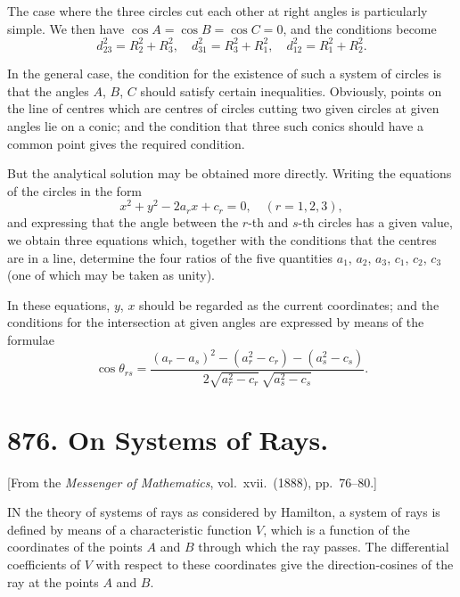 \documentclass[12pt,a4paper]{article}
\theoremstyle{plain}
\begin{document}
\medskip\noindent
The case where the three circles cut each other at right angles is particularly simple. We then have $\cos A = \cos B = \cos C = 0$, and the conditions become
\[
d_{23}^{2} = R_{2}^{2} + R_{3}^{2}, \quad d_{31}^{2} = R_{3}^{2} + R_{1}^{2}, \quad d_{12}^{2} = R_{1}^{2} + R_{2}^{2}.
\]

\medskip\noindent
In the general case, the condition for the existence of such a system of circles is that the angles $A$, $B$, $C$ should satisfy certain inequalities. Obviously, points on the line of centres which are centres of circles cutting two given circles at given angles lie on a conic; and the condition that three such conics should have a common point gives the required condition.

But the analytical solution may be obtained more directly. Writing the equations of the circles in the form
\[
x^{2} + y^{2} - 2a_{r}x + c_{r} = 0, \quad (r = 1, 2, 3),
\]
and expressing that the angle between the $r$-th and $s$-th circles has a given value, we obtain three equations which, together with the conditions that the centres are in a line, determine the four ratios of the five quantities $a_{1}$, $a_{2}$, $a_{3}$, $c_{1}$, $c_{2}$, $c_{3}$ (one of which may be taken as unity).

In these equations, $y$, $x$ should be regarded as the current coordinates; and the conditions for the intersection at given angles are expressed by means of the formulae
\[
\cos \theta_{rs} = \frac{(a_{r} - a_{s})^{2} - (a_{r}^{2} - c_{r}) - (a_{s}^{2} - c_{s})}{2\sqrt{a_{r}^{2} - c_{r}}\,\sqrt{a_{s}^{2} - c_{s}}}.
\]

\newpage
\section[876]{876. On Systems of Rays.}
\label{sec:876}

[From the \textit{Messenger of Mathematics}, vol.\ xvii.\ (1888), pp.\ 76--80.]

\medskip\noindent
IN the theory of systems of rays as considered by Hamilton, a system of rays is defined by means of a characteristic function $V$, which is a function of the coordinates of the points $A$ and $B$ through which the ray passes. The differential coefficients of $V$ with respect to these coordinates give the direction-cosines of the ray at the points $A$ and $B$.
\end{document}

